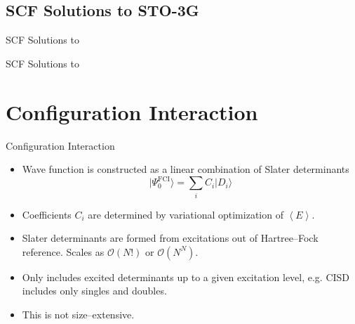 \documentclass{beamer}
\newcommand{\ket}[1] {{| #1 \rangle}}
\begin{document}
\subsection{SCF Solutions to  STO-3G}
\begin{frame}{SCF Solutions to }
 \vspace{-1em}
 \begin{center}

 \end{center}
\end{frame}


\begin{frame}{SCF Solutions to }
 \vspace{-1em}
 \begin{center}

 \end{center}

\end{frame}

\section{Configuration Interaction}
\begin{frame}{Configuration Interaction}
  \begin{itemize}
   \item<2->{Wave function is constructed as a linear combination of Slater determinants}
             $$\ket{\Psi_0^{\mathrm{FCI}}} = \sum_i C_i \ket{D_i}$$
   \item<3->{Coefficients $C_i$ are determined by variational optimization of $\left< E \right>$.}
   \item<4->{Slater determinants are formed from excitations out of Hartree--Fock reference. Scales as $\mathcal{O}(N!)$ or $\mathcal{O}(N^N)$.}
  \end{itemize}

  \begin{itemize}
   \item<6->{Only includes excited determinants up to a given excitation level, e.g. CISD includes only singles and doubles.}
   \item<7->{This is \alert{not size--extensive}.}
  \end{itemize}
\end{frame}
 
\end{document}
